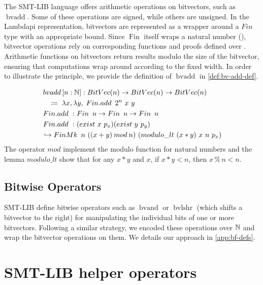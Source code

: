 The SMT-LIB language offers arithmetic operations on bitvectors, such as $\mathop{bvadd}$.
Some of these operations are signed, while others are unsigned. In the Lambdapi representation, bitvectors are represented as a wrapper around a $Fin$ type with an appropriate bound.
Since $\mathop{Fin}$ itself wraps a natural number (\N), bitvector operations rely on corresponding functions and proofs defined over \N.
Arithmetic functions on bitvectors return results modulo the size of the bitvector, ensuring that computations wrap around according to the fixed width.
In order to illustrate the principle, we provide the definition of $\mathop{bvadd}$ in \cref{def:bv-add-def}.

\begin{definition}\label{def:bv-add-def}
\begin{align*}
&\mathop{bvadd}\,[n : \mathbb{N}] : \mathop{BitVec}(n) \rightarrow \mathop{BitVec}(n) \rightarrow \mathop{BitVec}(n) \\
&\quad\coloneq\; \lambda x, \lambda y, \; \mathop{Fin.add}~2^n~x~y \\
&\mathop{Fin.add}~: \mathop{Fin}~n \rightarrow \mathop{Fin}~n \rightarrow \mathop{Fin}~n \\
&\mathop{Fin.add}~: (\mathbin{exist}~x~p_x) (\mathbin{exist}~y~p_y) \\
&\hookrightarrow \mathop{FinMk}~n~((x + y) \mathbin{mod} n)~(modulo\_lt~(x * y)~x~n~p_x)
\end{align*}
The operator $\mathbin{mod}$ implement the modulo function for natural numbers and the lemma $modulo\_lt$
show that for any $x * y$ and $x$, if $x * y < n$, then $x \mathbin{\%} n < n$.
\end{definition}


\subsection{Bitwise Operators}

SMT-LIB define bitwise operators such as $\mathop{bvand}$ or $\mathop{bvlshr}$  (which shifts a bitvector to the right) for manipulating the individual bits of one or more bitvectors.
Following a similar strategy, we encoded these operations over $\mathbb{N}$ and wrap the bitvector operations on them. We details our approach in \cref{app:bf-defs}.

\section{SMT-LIB helper operators}
\label{sec:encoding-helper-operator}


